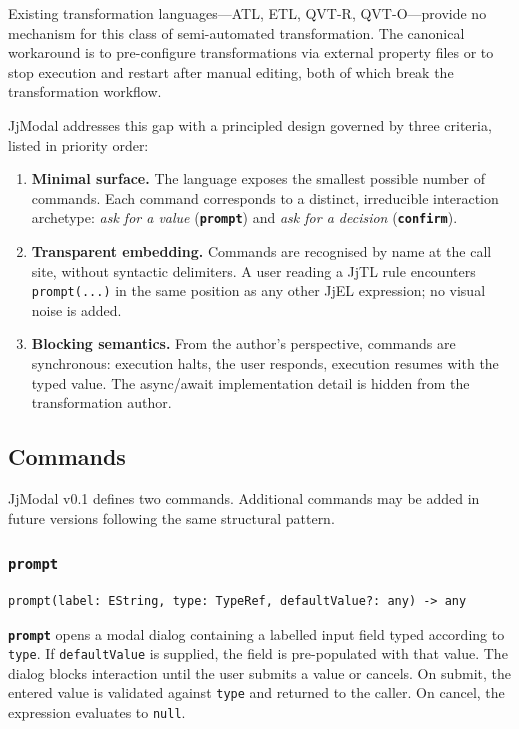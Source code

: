 \documentclass[11pt,a4paper]{article}
\newcommand{\jjmodal}{\textsf{JjModal}}
\newcommand{\jjel}{\textsf{JjEL}}
\newcommand{\jjtl}{\textsf{JjTL}}
\newcommand{\kw}[1]{\texttt{\textbf{#1}}}
\begin{document}
Existing transformation languages---ATL, ETL, QVT-R, QVT-O---provide no
mechanism for this class of semi-automated transformation. The canonical
workaround is to pre-configure transformations via external property files
or to stop execution and restart after manual editing, both of which break
the transformation workflow.
 
\jjmodal{} addresses this gap with a principled design governed by three
criteria, listed in priority order:
 
\begin{enumerate}
    \item \textbf{Minimal surface.} The language exposes the smallest
          possible number of commands. Each command corresponds to a
          distinct, irreducible interaction archetype: \emph{ask for a
          value} (\kw{prompt}) and \emph{ask for a decision}
          (\kw{confirm}).
    \item \textbf{Transparent embedding.} Commands are recognised by name
          at the call site, without syntactic delimiters. A user reading a
          \jjtl{} rule encounters \texttt{prompt(...)} in the same
          position as any other \jjel{} expression; no visual noise is
          added.
    \item \textbf{Blocking semantics.} From the author's perspective,
          commands are synchronous: execution halts, the user responds,
          execution resumes with the typed value. The async/await
          implementation detail is hidden from the transformation author.
\end{enumerate}
 
\subsection{Commands}
 
\jjmodal{} v0.1 defines two commands. Additional commands may be added in
future versions following the same structural pattern.
 
\subsubsection{\texttt{prompt}}
 
\begin{lstlisting}[style=jjmodal,numbers=none]
prompt(label: EString, type: TypeRef, defaultValue?: any) -> any
\end{lstlisting}
 
\kw{prompt} opens a modal dialog containing a labelled input field typed
according to \texttt{type}. If \texttt{defaultValue} is supplied, the
field is pre-populated with that value. The dialog blocks interaction
until the user submits a value or cancels. On submit, the entered value is
validated against \texttt{type} and returned to the caller. On cancel, the
expression evaluates to \texttt{null}.
 
\end{document}
